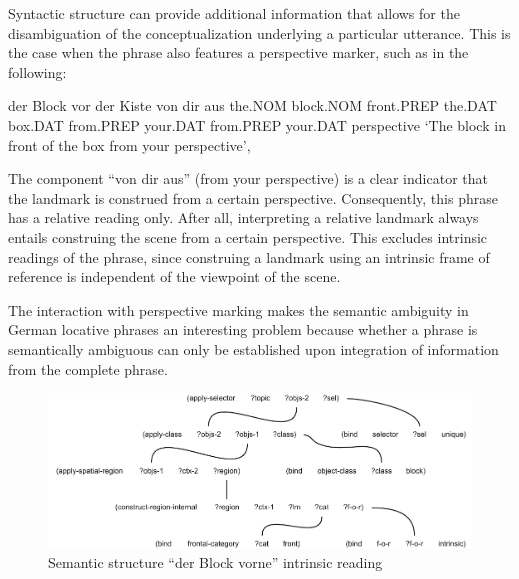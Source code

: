 Syntactic structure can provide additional information that allows 
for the disambiguation of the conceptualization underlying a particular utterance. 
This is the case when the phrase also features a perspective marker, 
such as in the following:
\begin{example}
\label{e:der-block-vor-der-kiste-von-dir-aus}
\gll der Block vor der Kiste von dir aus 
the.NOM block.NOM front.PREP the.DAT box.DAT from.PREP your.DAT from.PREP your.DAT perspective 
\glt `The block in front of the box from your perspective',
\glend
\end{example}
The component ``von dir aus'' (from your perspective) is a clear indicator that
the landmark is construed from a certain perspective. Consequently, this phrase 
has a relative reading only. After all, interpreting a relative landmark always entails 
construing the scene from a certain perspective.
This excludes intrinsic readings of the phrase, since construing 
a landmark using an intrinsic frame of reference is independent of the viewpoint of the scene. 


The interaction with perspective marking makes the semantic 
ambiguity in German locative phrases an interesting problem
because whether a phrase is semantically ambiguous can only be established upon
integration of information from the complete phrase.

\begin{figure}
\begin{center}
\includegraphics[width=\columnwidth]{figs/der-block-vorne-semantic-structure-intrinsic}
\caption[Semantic structure of ``der Block vorne'' (the block in front) -- intrinsic]{Semantic structure ``der Block vorne'' intrinsic reading}
\label{f:der-block-vorne-semantic-structure-intrinsic}
\end{center}
\end{figure}

